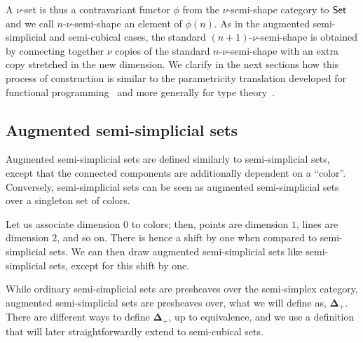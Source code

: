 \documentclass{msc}
\newcommand{\DeltaPlus}{\ensuremath{\boldsymbol{\Delta}_+}}
\begin{document}
A $\nu$-set is thus a contravariant functor $\phi$ from the $\nu$-semi-shape category to $\mathsf{Set}$ and we call $n$-$\nu$-semi-shape an element of $\phi(n)$. As in the augmented semi-simplicial and semi-cubical cases, the standard $(n + 1)$-$\nu$-semi-shape is obtained by connecting together $\nu$ copies of the standard $n$-$\nu$-semi-shape with an extra copy stretched in the new dimension. We clarify in the next sections how this process of construction is similar to the parametricity translation developed for functional programming~\cite{reynolds83} and more generally for type theory~\cite{bernardy10, bernardy11, atkey14, bernardy15}.

\subsection{Augmented semi-simplicial sets}
Augmented semi-simplicial sets are defined similarly to semi-simplicial sets, except that the connected components are additionally dependent on a ``color''. Conversely, semi-simplicial sets can be seen as augmented semi-simplicial sets over a singleton set of colors.

Let us associate dimension $0$ to colors; then, points are dimension $1$, lines are dimension $2$, and so on. There is hence a shift by one when compared to semi-simplicial sets. We can then draw augmented semi-simplicial sets like semi-simplicial sets, except for this shift by one.

While ordinary semi-simplicial sets are presheaves over the semi-simplex category, augmented semi-simplicial sets are presheaves over, what we will define as, \DeltaPlus. There are different ways to define \DeltaPlus, up to equivalence, and we use a definition that will later straightforwardly extend to semi-cubical sets.



\end{document}
